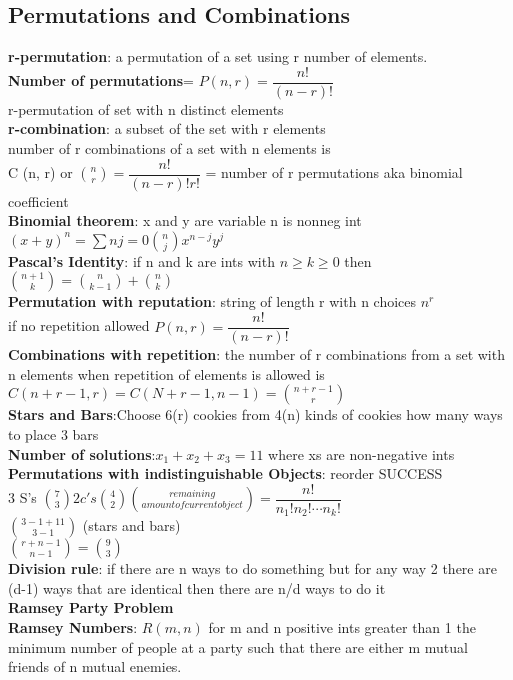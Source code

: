\documentclass[a4paper]{article}
\begin{document}
\begin{multicols}{2}
	\subsection{Permutations and Combinations}
	\textbf{r-permutation}: a permutation of a set using r number of
	elements.\\
	\textbf{Number of permutations}= $P(n,r)=\dfrac{n!}{(n-r)!}$\\r-permutation
	of set with n distinct elements\\
	\textbf{r-combination}: a subset of the set with r elements\\
	number of r combinations of a set with n elements is\\
	C (n, r) or
	$\binom{n}{r}=\dfrac{n!}{(n-r)!r!}$ = number of r permutations
	aka binomial coefficient\\
	\textbf{Binomial theorem}: x and y are variable n is nonneg int\\
	${(x+y)}^{n}=\sum{n}{j=0}\binom{n}{j}x^{n-j}y^{j}$\\
	\textbf{Pascal's Identity}: if n and k are ints with $n \geq k \geq 0$ then
	\\
	$\binom{n+1}{k}=\binom{n}{k-1}+\binom{n}{k}$\\
	\textbf{Permutation with reputation}: string of length r with n choices
	$n^r$\\
	if no repetition allowed $P(n,r)=\dfrac{n!}{(n-r)!}$\\
	\textbf{Combinations with repetition}: the number of r combinations from a
	set with n elements when repetition of elements is allowed is\\
	$C(n+r-1,r)=C(N+r-1,n-1)=\binom{n+r-1}{r}$\\
	\textbf{Stars and Bars}:Choose 6(r) cookies from 4(n) kinds of cookies how
	many ways to place 3 bars\\
	\textbf{Number of solutions}:$x_1+x_2+x_3=11$ where xs are non-negative
	ints\\
	\textbf{Permutations with indistinguishable Objects}: reorder SUCCESS\\
	3 S's $\binom{7}{3} 2 c's \binom{4}{2} \binom{remaining}{amount of current object}=\dfrac{n!}{n_1!n_2!\cdots n_k!}$\\
	$\binom{3-1+11}{3-1}$ (stars and bars)\\
	$\binom{r+n-1}{n-1}=\binom{9}{3}$\\
	\textbf{Division rule}: if there are n ways to do something but for any way
	2 there are (d-1) ways that are identical then there are n/d ways to do it
	\\
	\textbf{Ramsey Party Problem\\
	Ramsey Numbers}: $R (m,n)$ for m and n positive ints greater than 1 the
	minimum number of people at a party such that there are either m mutual
	friends of n mutual enemies.

\end{multicols}
\end{document}
